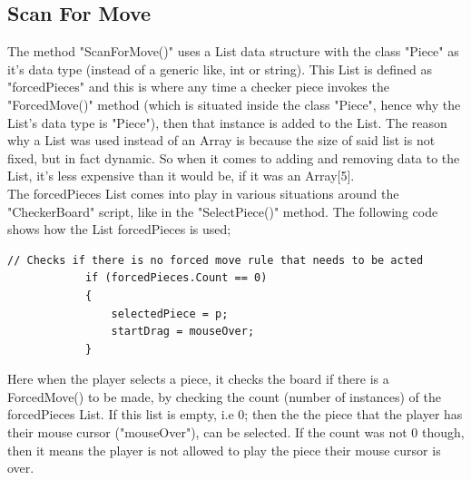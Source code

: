 \documentclass[10pt, a4paper]{article}
\begin{document}
	 \subsection{Scan For Move}
	 The method "ScanForMove()" uses a List data structure with the class "Piece" as it's data type (instead of a generic like, int or string). This List is defined as "forcedPieces" and this is where any time a checker piece invokes the "ForcedMove()" method (which is situated inside the class "Piece", hence why the List's data type is "Piece"), then that instance is added to the List. The reason why a List was used instead of an Array is because the size of said list is not fixed, but in fact dynamic. So when it comes to adding and removing data to the List, it's less expensive than it would be, if it was an Array[5].
\\	 
	 The forcedPieces List comes into play in various situations around the "CheckerBoard" script, like in the "SelectPiece()" method. The following code shows how the List forcedPieces is used;
	 \begin{lstlisting}[caption = SelectPiece()]
	 // Checks if there is no forced move rule that needs to be acted
            if (forcedPieces.Count == 0)
            {
                selectedPiece = p;
                startDrag = mouseOver;
            }
	 \end{lstlisting}
	 Here when the player selects a piece, it checks the board if there is a ForcedMove() to be made, by checking the count (number of instances) of the forcedPieces List. If this list is empty, i.e 0; then the the piece that the player has their mouse cursor ("mouseOver"), can be selected. If the count was not 0 though, then it means the player is not allowed to play the piece their mouse cursor is over.
	 
\end{document}

